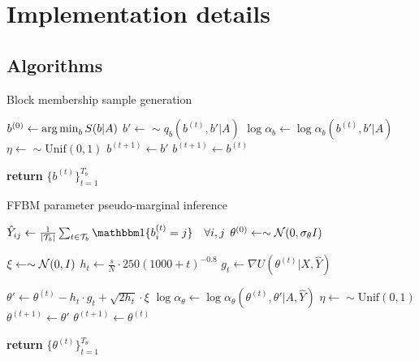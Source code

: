 \section{Implementation details}

\subsection{Algorithms}
\label{appdx:algorithms}

\begin{algorithm} %
	\caption{Block membership sample generation} %
	\label{alg:b-samples} %
	\begin{algorithmic} %
		\State $b^{(0)} \gets \operatorname*{arg\,min}_b S(b|A)$ 
		\State $b' \gets \sim q_b(b^{(t)}, b' | A)$
		\State $\log \alpha_b \gets \log \alpha_b(b^{(t)}, b' | A)$
		\State $\eta \gets \sim \textrm{Unif}(0,1)$
		\State $b^{(t+1)} \gets b'$
		\Else
		\State $b^{(t+1)} \gets b^{(t)}$
		\EndIf
		\EndFor
		
		\State \textbf{return} $\{b^{(t)}\}_{t=1}^{T_b}$
		\EndProcedure
	\end{algorithmic}
\end{algorithm}

\begin{algorithm} %
	\caption{FFBM parameter pseudo-marginal inference} %
	\label{alg:theta-samples} %
	\begin{algorithmic} %
		\State $\hat{Y}_{ij} \gets \frac{1}{|\Tcal_b|} \sum_{t \in \Tcal_b} \one \{ b^{(t)}_i = j\} \quad \forall i,j$
		\State $\theta^{(0)} \gets \sim \mathcal{N}(0, \sigma_\theta I)$
		
		\item[]
		
		\State $\xi \gets \sim \mathcal{N}(0, I)$
		\State $h_t \gets \frac{s}{N} \cdot 250(1000 + t)^{-0.8}$
		\State $g_t \gets \nabla U(\theta^{(t)}| X, \hat{Y})$
		\item[]
		\State $\theta' \gets \theta^{(t)} - h_t \cdot g_t + \sqrt{2h_t} \cdot \xi$
		\State $\log \alpha_\theta \gets \log \alpha_\theta(\theta^{(t)}, \theta' | A, \hat{Y})$
		\State $\eta \gets \sim \textrm{Unif}(0,1)$
		\If{$\log \eta < \log \alpha_\theta$}
		\State $\theta^{(t+1)} \gets \theta'$
		\Else
		\State $\theta^{(t+1)} \gets \theta^{(t)}$
		\EndIf
		\EndFor
		
		\State \textbf{return} $\{\theta^{(t)}\}_{t=1}^{T_\theta}$
		\EndProcedure
	\end{algorithmic}
\end{algorithm}

